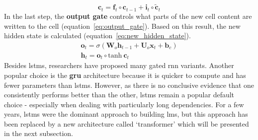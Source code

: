 \begin{equation}
	\label{eq:new_cell_state}
	\boldsymbol{c}_t = \boldsymbol{f}_t \circ \boldsymbol{c}_{t-1} + \boldsymbol{i}_t \circ \widetilde{\boldsymbol{c}}_t
\end{equation}
In the last step, the \textbf{output gate} controls what parts of the new cell content are written to the cell (equation~\ref{eq:output_gate}). Based on this result, the new hidden state is calculated (equation~\ref{eq:new_hidden_state}).
\begin{align}
	\label{eq:output_gate}
	\boldsymbol{o}_t = \sigma \left( \boldsymbol{W}_o \boldsymbol{h}_{t-1} + \boldsymbol{U}_o \boldsymbol{x}_t + \boldsymbol{b}_c \right) \\
	\label{eq:new_hidden_state}
	\boldsymbol{h}_t = \boldsymbol{o}_t \circ \text{tanh} \ \boldsymbol{c}_t
\end{align}
Besides \gls{lstm}s, researchers have proposed many gated \gls{rnn} variants. Another popular choice is the \textbf{\gls{gru}} architecture because it is quicker to compute and has fewer parameters than \gls{lstm}s. However, as there is no conclusive evidence that one consistently performs better than the other, \gls{lstm}s remain a popular default choice - especially when dealing with particularly long dependencies. For a few years, \gls{lstm}s were the dominant approach to building \gls{lm}s, but this approach has been replaced by a new architecture called `transformer' which will be presented in the next subsection.
